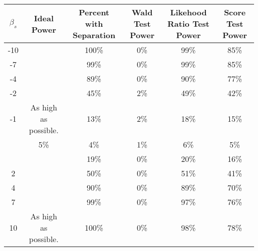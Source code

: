 
\begin{tabular}{>{}cccccc}
\toprule
$\beta_s$ & Ideal Power & Percent with Separation & Wald Test Power & Likehood Ratio Test Power & Score Test Power\\
\midrule
-10 &  & 100\% & 0\% & 99\% & 85\%\\

-7 &  & 99\% & 0\% & 99\% & 85\%\\

-4 &  & 89\% & 0\% & 90\% & 77\%\\

-2 &  & 45\% & 2\% & 49\% & 42\%\\

-1 & \multirow{-5}{*}{\centering\arraybackslash As high as possible.} & 13\% & 2\% & 18\% & 15\%\\
\addlinespace
0 & 5\% & 4\% & 1\% & 6\% & 5\%\\
\addlinespace
1 &  & 19\% & 0\% & 20\% & 16\%\\

2 &  & 50\% & 0\% & 51\% & 41\%\\

4 &  & 90\% & 0\% & 89\% & 70\%\\

7 &  & 99\% & 0\% & 97\% & 76\%\\

10 & \multirow{-5}{*}{\centering\arraybackslash As high as possible.} & 100\% & 0\% & 98\% & 78\%\\
\bottomrule
\end{tabular}